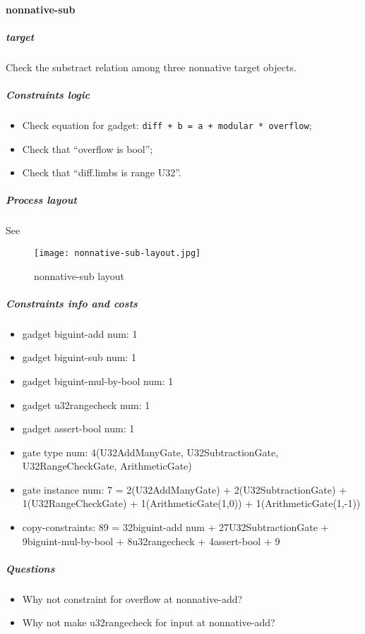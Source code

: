 \paragraph{nonnative-sub}

\subparagraph{target}
Check the substract relation among three nonnative target objects.

\subparagraph{Constraints logic}
\begin{itemize}
    \item Check equation for gadget: \verb|diff + b = a + modular * overflow|;
    \item Check that ``overflow is bool'';
    \item Check that ``diff.limbs is range U32''.
\end{itemize}

\subparagraph{Process layout}
See 
\begin{figure}[!ht]
    \centering
    \texttt{[image: nonnative-sub-layout.jpg]}
    \caption{nonnative-sub layout}
    \label{fig:nonnative-sub-layout}
\end{figure}

\subparagraph{Constraints info and costs}
\begin{itemize}
    \item gadget biguint-add num: 1
    \item gadget biguint-sub num: 1
    \item gadget biguint-mul-by-bool num: 1
    \item gadget u32rangecheck num: 1
    \item gadget assert-bool num: 1
    \item gate type num: 4(U32AddManyGate, U32SubtractionGate, U32RangeCheckGate, ArithmeticGate)
    \item gate instance num: 7 = 2(U32AddManyGate) + 2(U32SubtractionGate) + 1(U32RangeCheckGate) + 1(ArithmeticGate(1,0)) + 1(ArithmeticGate(1,-1))
    \item copy-constraints: 89 = 32{biguint-add num} + 27{U32SubtractionGate} + 9{biguint-mul-by-bool} + 8{u32rangecheck} + 4{assert-bool} + 9
\end{itemize}

\subparagraph{Questions}
\begin{itemize}
    \item Why not constraint for overflow at nonnative-add?
    \item Why not make u32rangecheck for input at nonnative-add?
\end{itemize}
